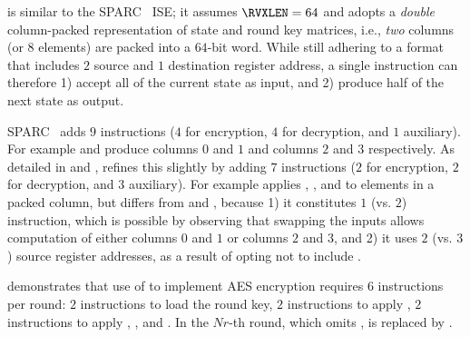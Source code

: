 
is similar to the SPARC~\cite[Page 109]{SPARC:16} ISE; it
assumes 
$\RVXLEN = 64$
and adopts a 
{\em double}
column-packed 
representation of state and round key matrices,
i.e., {\em two} columns (or $8$ elements) are packed into a $64$-bit word.
While still adhering to a format that
includes $2$ source and $1$ destination register address,
a single instruction can therefore 
1) accept  all  of the current state as  input,
   and
2) produce half of the next    state as output.

SPARC~\cite[Page 109]{SPARC:16}
adds
$ 9$
instructions ($4$ for encryption, $4$ for decryption, and $1$ auxiliary).
For example
and
produce
columns $0$ and $1$
and
columns $2$ and $3$
respectively.
As detailed in
and
,
refines this slightly by 
adding 
$ 7$
instructions ($2$ for encryption, $2$ for decryption, and $3$ auxiliary).
For example
applies
, , and   
to elements in   a packed column,
but differs from 
and
,
because
1) it constitutes
   $1$ (vs. $2$)
   instruction,
   which is possible by observing that swapping the inputs allows 
   computation of either 
   columns $0$ and $1$ 
   or 
   columns $2$ and $3$,
   and
2) it uses 
   $2$ (vs. $3$)
   source register addresses, 
   as a result of opting not to include
   .

demonstrates that use of  to implement AES encryption requires
$ 6$ instructions per round:
$ 2$            
     instructions to load the round key,
$ 2$            
     instructions to apply ,
$ 2$   
     instructions to apply , , and .
In the $Nr$-th round, which omits ,
is replaced by 
     .

